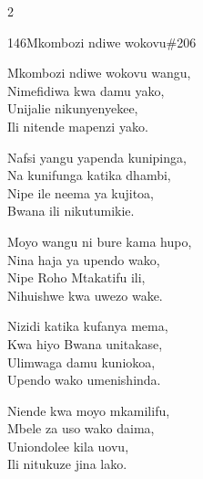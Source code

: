 \documentclass{article}
\begin{document}
\begin{multicols}{2}
\begin{hymn}{146}{Mkombozi ndiwe wokovu}{\#206}
\begin{stanza}
Mkombozi ndiwe wokovu wangu,\\
Nimefidiwa kwa damu yako,\\
Unijalie nikunyenyekee,\\
Ili nitende mapenzi yako.
\end{stanza}
\begin{stanza}
Nafsi yangu yapenda kunipinga,\\
Na kunifunga katika dhambi,\\
Nipe ile neema ya kujitoa,\\
Bwana ili nikutumikie.
\end{stanza}
\begin{stanza}
Moyo wangu ni bure kama hupo,\\
Nina haja ya upendo wako,\\
Nipe Roho Mtakatifu ili,\\
Nihuishwe kwa uwezo wake.
\end{stanza}
\begin{stanza}
Nizidi katika kufanya mema,\\
Kwa hiyo Bwana unitakase,\\
Ulimwaga damu kuniokoa,\\
Upendo wako umenishinda.
\end{stanza}
\begin{stanza}
Niende kwa moyo mkamilifu,\\
Mbele za uso wako daima,\\
Uniondolee kila uovu,\\
Ili nitukuze jina lako.
\end{stanza}
\end{hymn}


\end{multicols}
\end{document}
